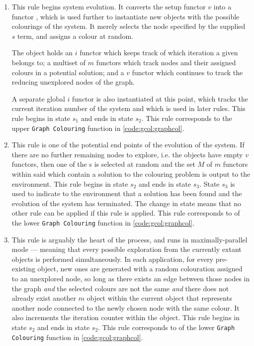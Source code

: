 \begin{enumerate}
\item This rule begins system evolution.  It converts the setup functor \(v\) into a functor \bo{}, which is used further to instantiate new objects with the possible colourings of the system.  It merely selects the node specified by the supplied \(s\) term, and assigns a colour at random.

The \bo{} object holds an \(i\) functor which keeps track of which iteration a given \bo{} belongs to; a multiset of \(m\) functors which track nodes and their assigned colours in a potential solution; and a \(v\) functor which continues to track the reducing unexplored nodes of the graph.

A separate global \(i\) functor is also instantiated at this point, which tracks the current iteration number of the system and which is used in later rules.  This rule begins in state \(s_1\) and ends in state \(s_2\).  This rule corresponds to the upper \texttt{Graph Colouring} function in \cref{code:gcol:graphcol}.

\item This rule is one of the potential end points of the evolution of the system.  If there are no further remaining nodes to explore, i.e. the \bo{} objects have empty \(v\) functors, then one of the \bo{}s is selected at random and the set \(M\) of \(m\) functors within said \bo{} which contain a solution to the colouring problem is output to the environment.  This rule begins in state \(s_2\) and ends in state \(s_3\).  State \(s_3\) is used to indicate to the environment that a solution has been found and the evolution of the system has terminated.  The change in state means that no other rule can be applied if this rule is applied.  This rule corresponds to  of the lower \texttt{Graph Colouring} function in \cref{code:gcol:graphcol}.

\item This rule is arguably the heart of the process, and runs in maximally-parallel mode --- meaning that every possible exploration from the currently extant \bo{} objects is performed simultaneously.  In each application, for every pre-existing \bo{} object, new ones are generated with a random colouration assigned to an unexplored node, so long as there exists an edge between those nodes in the graph \emph{and} the selected colours are not the same \emph{and} there does not already exist another \(m\) object within the current \bo{} object that represents another node connected to the newly chosen node with the same colour.  It also increments the iteration counter within the \bo{} object.  This rule begins in state \(s_2\) and ends in state \(s_2\).  This rule corresponds to  of the lower \texttt{Graph Colouring} function in \cref{code:gcol:graphcol}.


\end{enumerate}
